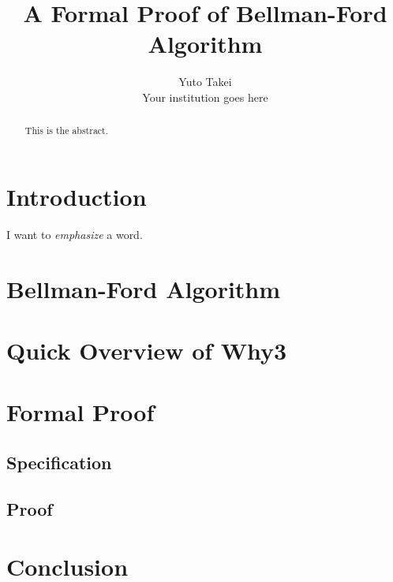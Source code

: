 \documentclass[a4paper,12pt]{article}
\title{A Formal Proof of Bellman-Ford Algorithm}
\author{Yuto Takei \\ Your institution goes here}
\begin{document}
\maketitle

\begin{abstract}
  This is the abstract.
\end{abstract}

\section{Introduction}

I want to \emph{emphasize} a word.

\section{Bellman-Ford Algorithm}

\section{Quick Overview of Why3}

\section{Formal Proof}

\subsection{Specification}

\subsection{Proof}

\section{Conclusion}
\end{document}
